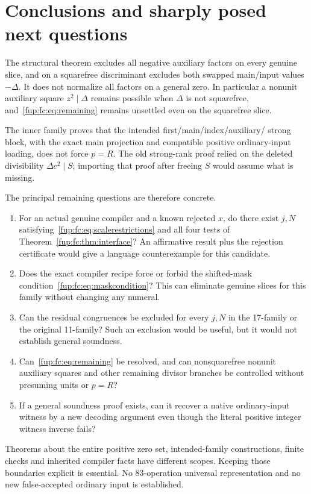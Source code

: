 \documentclass[11pt,letterpaper]{article}
\theoremstyle{definition}\newtheorem{definition}[theorem]{Definition}
\theoremstyle{remark}\newtheorem{remark}[theorem]{Remark}
\newcommand{\D}{\Delta}
\begin{document}
\section{Conclusions and sharply posed next questions}
\label{fup:fc:sec:conclusions}
The structural theorem excludes all negative auxiliary factors on every
genuine slice, and on a squarefree discriminant excludes both swapped
main/input values $-\D$. It does not normalize all factors on a general
zero. In particular a nonunit auxiliary square $z^2\mid\D$ remains
possible when $\D$ is not squarefree, and~\eqref{fup:fc:eq:remaining} remains
unsettled even on the squarefree slice.

The inner family proves that the intended first/main/index/auxiliary/
strong block, with the exact main projection and compatible positive
ordinary-input loading, does not force $p=R$. The old strong-rank proof
relied on the deleted divisibility $\D c^2\mid S$; importing that proof
after freeing $S$ would assume what is missing.

The principal remaining questions are therefore concrete.
\begin{enumerate}
\item For an actual genuine compiler and a known rejected $x$, do there
exist $j,N$ satisfying~\eqref{fup:fc:eq:scalerestrictions} and all four tests
of Theorem~\ref{fup:fc:thm:interface}? An affirmative result plus the rejection
certificate would give a language counterexample for this candidate.
\item Does the exact compiler recipe force or forbid the shifted-mask
condition~\eqref{fup:fc:eq:maskcondition}? This can eliminate genuine slices
for this family without changing any numeral.
\item Can the residual congruences be excluded for every $j,N$ in the
17-family or the original 11-family? Such an exclusion would be useful,
but it would not establish general soundness.
\item Can~\eqref{fup:fc:eq:remaining} be resolved, and can nonsquarefree
nonunit auxiliary squares and other remaining divisor branches be
controlled without presuming units or $p=R$?
\item If a general soundness proof exists, can it recover a native
ordinary-input witness by a new decoding argument even though the literal
positive integer witness inverse fails?
\end{enumerate}
Theorems about the entire positive zero set, intended-family constructions,
finite checks and inherited compiler facts have different scopes. Keeping
those boundaries explicit is essential. No 83-operation universal
representation and no new false-accepted ordinary input is established.
\end{document}
